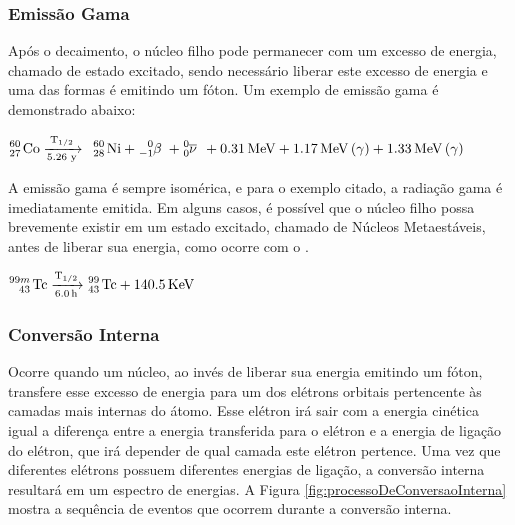 \documentclass[11pt,a4paper]{article}
\newcounter{exemplo}
\begin{document}
            \subsubsection{Emissão Gama}

                Após o decaimento, o núcleo filho pode permanecer com um excesso de energia, chamado de estado excitado, sendo necessário liberar este excesso de energia e uma das formas é emitindo um fóton. Um exemplo de emissão gama é demonstrado abaixo:

                \begin{center}
                    $\ce{^{60}_{27} Co  ->[{T_{1/2}}][{5.26 y}] \; ^{60}_{28} Ni + ^{0}_{-1}\beta \; + ^{0}_{0}\overline{\nu} \; + 0.31 MeV + 1.17 MeV (\gamma) + 1.33 MeV (\gamma)}$
                \end{center}
                
                A emissão gama é sempre isomérica, e para o exemplo citado, a radiação gama é imediatamente emitida. Em alguns casos, é possível que o núcleo filho possa brevemente existir em um estado excitado, chamado de Núcleos Metaestáveis, antes de liberar sua energia, como ocorre com o .

                \begin{center}
                    $\ce{^{99m}_{43} Tc ->[{T_{1/2}}][6.0 h] ^{99}_{43} Tc + 140.5 KeV}$
                \end{center}
            
            \subsubsection{Conversão Interna}

                
                Ocorre quando um núcleo, ao invés de liberar sua energia emitindo um fóton, transfere esse excesso de energia para um dos elétrons orbitais pertencente às camadas mais internas do átomo.  Esse elétron irá sair com a energia cinética igual a diferença entre a energia transferida para o elétron e a energia de ligação do elétron, que irá depender de qual camada este elétron pertence. Uma vez que diferentes elétrons possuem diferentes energias de ligação, a conversão interna resultará em um espectro de energias. A Figura \ref{fig:processoDeConversaoInterna} mostra a sequência de eventos que ocorrem durante a conversão interna.
\end{document}
